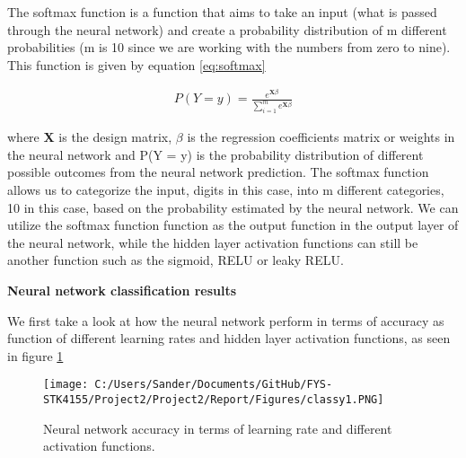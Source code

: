 \documentclass[12pt,a4paper]{article}
\begin{document}
\noindent The softmax function is a function that aims to take an input (what is passed through the neural network) and create a probability distribution of m different probabilities (m is 10 since we are working with the numbers from zero to nine). This function is given by equation \ref{eq:softmax}

\begin{equation}\label{eq:softmax}
\begin{aligned}
P(Y = y) = \frac{e^{\textbf{X}\beta}}{\sum_{i = 1}^m e^{\textbf{X}\beta}} 
\end{aligned}
\end{equation}

\noindent where \textbf{X} is the design matrix, $\beta$ is the regression coefficients matrix or weights in the neural network and P(Y = y) is the probability distribution of different possible outcomes from the neural network prediction. The softmax function allows us to categorize the input, digits in this case, into m different categories, 10 in this case, based on the probability estimated by the neural network. We can utilize the softmax function function as the output function in the output layer of the neural network, while the hidden layer activation functions can still be another function such as the sigmoid, RELU or leaky RELU. 

\begin{center}
\large{\textbf{Neural network classification results}}
\end{center}

\noindent We first take a look at how the neural network perform in terms of accuracy as function of different learning rates and hidden layer activation functions, as seen in figure \ref{fig:AccvsLrate}

\begin{figure}[H]
\centering
\texttt{[image: C:/Users/Sander/Documents/GitHub/FYS-STK4155/Project2/Project2/Report/Figures/classy1.PNG]}
\caption{\label{fig:AccvsLrate} Neural network accuracy in terms of learning rate and different activation functions.}
\end{figure}
\end{document}
